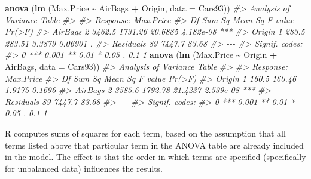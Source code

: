 \documentclass[
]{book}
\newenvironment{Shaded}{\begin{snugshade}}{\end{snugshade}}
\newcommand{\AttributeTok}[1]{\textcolor[rgb]{0.13,0.29,0.53}{#1}}
\newcommand{\CommentTok}[1]{\textcolor[rgb]{0.56,0.35,0.01}{\textit{#1}}}
\newcommand{\FunctionTok}[1]{\textcolor[rgb]{0.13,0.29,0.53}{\textbf{#1}}}
\newcommand{\NormalTok}[1]{#1}
\newcommand{\SpecialCharTok}[1]{\textcolor[rgb]{0.81,0.36,0.00}{\textbf{#1}}}
\begin{document}
\begin{Shaded}
\begin{Highlighting}[]
\FunctionTok{anova}\NormalTok{ (}\FunctionTok{lm}\NormalTok{ (Max.Price }\SpecialCharTok{\textasciitilde{}}\NormalTok{ AirBags }\SpecialCharTok{+}\NormalTok{ Origin, }\AttributeTok{data =}\NormalTok{ Cars93))}
\CommentTok{\#\textgreater{} Analysis of Variance Table}
\CommentTok{\#\textgreater{} }
\CommentTok{\#\textgreater{} Response: Max.Price}
\CommentTok{\#\textgreater{}           Df Sum Sq Mean Sq F value    Pr(\textgreater{}F)    }
\CommentTok{\#\textgreater{} AirBags    2 3462.5 1731.26 20.6885 4.182e{-}08 ***}
\CommentTok{\#\textgreater{} Origin     1  283.5  283.51  3.3879   0.06901 .  }
\CommentTok{\#\textgreater{} Residuals 89 7447.7   83.68                      }
\CommentTok{\#\textgreater{} {-}{-}{-}}
\CommentTok{\#\textgreater{} Signif. codes:  }
\CommentTok{\#\textgreater{} 0 \textquotesingle{}***\textquotesingle{} 0.001 \textquotesingle{}**\textquotesingle{} 0.01 \textquotesingle{}*\textquotesingle{} 0.05 \textquotesingle{}.\textquotesingle{} 0.1 \textquotesingle{} \textquotesingle{} 1}
\FunctionTok{anova}\NormalTok{ (}\FunctionTok{lm}\NormalTok{ (Max.Price }\SpecialCharTok{\textasciitilde{}}\NormalTok{ Origin }\SpecialCharTok{+}\NormalTok{ AirBags, }\AttributeTok{data =}\NormalTok{ Cars93))}
\CommentTok{\#\textgreater{} Analysis of Variance Table}
\CommentTok{\#\textgreater{} }
\CommentTok{\#\textgreater{} Response: Max.Price}
\CommentTok{\#\textgreater{}           Df Sum Sq Mean Sq F value    Pr(\textgreater{}F)    }
\CommentTok{\#\textgreater{} Origin     1  160.5  160.46  1.9175    0.1696    }
\CommentTok{\#\textgreater{} AirBags    2 3585.6 1792.78 21.4237 2.539e{-}08 ***}
\CommentTok{\#\textgreater{} Residuals 89 7447.7   83.68                      }
\CommentTok{\#\textgreater{} {-}{-}{-}}
\CommentTok{\#\textgreater{} Signif. codes:  }
\CommentTok{\#\textgreater{} 0 \textquotesingle{}***\textquotesingle{} 0.001 \textquotesingle{}**\textquotesingle{} 0.01 \textquotesingle{}*\textquotesingle{} 0.05 \textquotesingle{}.\textquotesingle{} 0.1 \textquotesingle{} \textquotesingle{} 1}
\end{Highlighting}
\end{Shaded}

R computes sums of squares for each term, based on the assumption that all terms listed above that particular term in the ANOVA table are already included in the model. The effect is that the order in which terms are specified (specifically for unbalanced data) influences the results.
\end{document}
